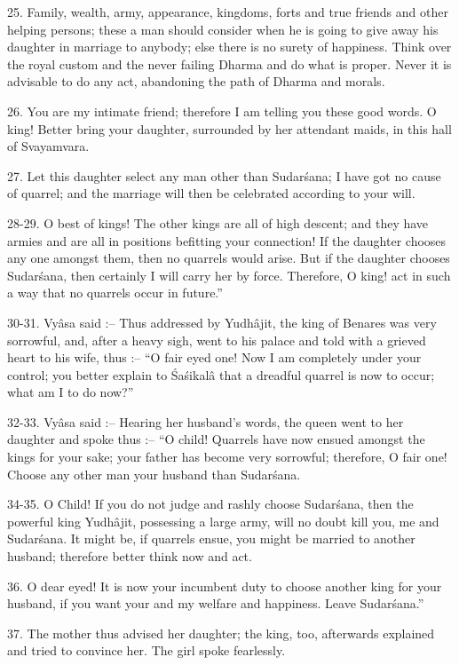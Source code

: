 25. Family, wealth, army, appearance, kingdoms, forts and true friends and other helping persons; these a man should consider when he is going to give away his daughter in marriage to anybody; else there is no surety of happiness. Think over the royal custom and the never failing Dharma and do what is proper. Never it is advisable to do any act, abandoning the path of Dharma and morals.

26. You are my intimate friend; therefore I am telling you these good words. O king! Better bring your daughter, surrounded by her attendant maids, in this hall of Svayamvara.

27. Let this daughter select any man other than Sudar\'sana; I have got no cause of quarrel; and the marriage will then be celebrated according to your will.

28-29. O best of kings! The other kings are all of high descent; and they have armies and are all in positions befitting your connection! If the daughter chooses any one amongst them, then no quarrels would arise. But if the daughter chooses Sudar\'sana, then certainly I will carry her by force. Therefore, O king! act in such a way that no quarrels occur in future.''

30-31. Vy\^asa said :-- Thus addressed by Yudh\^ajit, the king of Benares was very sorrowful, and, after a heavy sigh, went to his palace and told with a grieved heart to his wife, thus :-- ``O fair eyed one! Now I am completely under your control; you better explain to \'Sa\'sikal\^a that a dreadful quarrel is now to occur; what am I to do now?''

32-33. Vy\^asa said :-- Hearing her husband's words, the queen went to her daughter and spoke thus :-- ``O child! Quarrels have now ensued amongst the kings for your sake; your father has become very sorrowful; therefore, O fair one! Choose any other man your husband than Sudar\'sana.

34-35. O Child! If you do not judge and rashly choose Sudar\'sana, then the powerful king Yudh\^ajit, possessing a large army, will no doubt kill you, me and Sudar\'sana. It might be, if quarrels ensue, you might be married to another husband; therefore better think now and act.

36. O dear eyed! It is now your incumbent duty to choose another king for your husband, if you want your and my welfare and happiness. Leave Sudar\'sana.''

37. The mother thus advised her daughter; the king, too, afterwards explained and tried to convince her. The girl spoke fearlessly.

